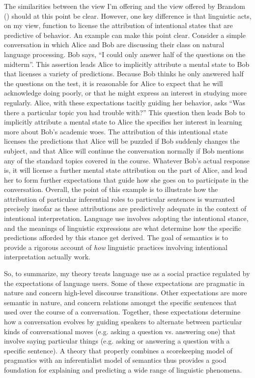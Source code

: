 The similarities between the view I'm offering and the view offered by Brandom (\citeyear{Brandom:1994}) should at this point be clear. However, one key difference is that linguistic acts, on my view, function to license the attribution of intentional states that are predictive of behavior. An example can make this point clear. Consider a simple conversation in which Alice and Bob are discussing their class on natural language processing. Bob says, ``I could only answer half of the questions on the midterm''. This assertion leads Alice to implicitly attribute a mental state to Bob that licenses a variety of predictions. Because Bob thinks he only answered half the questions on the test, it is reasonable for Alice to expect that he will acknowledge doing poorly, or that he might express an interest in studying more regularly. Alice, with these expectations tacitly guiding her behavior, asks ``Was there a particular topic you had trouble with?'' This question then leads Bob to implicitly attribute a mental state to Alice the specifies her interest in learning more about Bob's academic woes. The attribution of this intentional state licenses the predictions that Alice will be puzzled if Bob suddenly changes the subject, and that Alice will continue the conversation normally if Bob mentions any of the standard topics covered in the course. Whatever Bob's actual response is, it will license a further mental state attribution on the part of Alice, and lead her to form further expectations that guide how she goes on to participate in the conversation. Overall, the point of this example is to illustrate how the attribution of particular inferential roles to particular sentences is warranted precisely insofar as these attributions are predictively adequate in the context of intentional interpretation. Language use involves adopting the intentional stance, and the meanings of linguistic expressions are what determine how the specific predictions afforded by this stance get derived. The goal of semantics is to provide a rigorous account of \textit{how} linguistic practices involving intentional interpretation actually work. 

So, to summarize, my theory treats language use as a social practice regulated by the expectations of language users. Some of these expectations are pragmatic in nature and concern high-level discourse transitions. Other expectations are more semantic in nature, and concern relations amongst the specific sentences that used over the course of a conversation. Together, these expectations determine how a conversation evolves by guiding speakers to alternate between particular kinds of conversational moves (e.g. asking a question vs. answering one) that involve saying particular things (e.g. asking or answering a question with a specific sentence). A theory that properly combines a scorekeeping model of pragmatics with an inferentialist model of semantics thus provides a good foundation for explaining and predicting a wide range of linguistic phenomena. 

